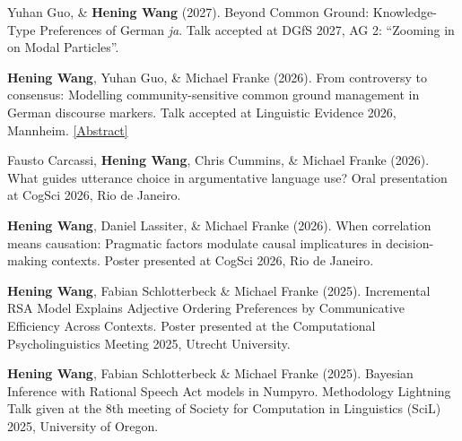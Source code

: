 \documentclass[letterpaper,11pt]{article}
\begin{document}
\begin{description}
\item {Yuhan Guo, \& \textbf{Hening Wang} (2027). Beyond Common Ground: Knowledge-Type Preferences of German \textit{ja}. Talk accepted at DGfS 2027, AG 2: ``Zooming in on Modal Particles''.}

\item {\textbf{Hening Wang}, Yuhan Guo, \& Michael Franke (2026). From controversy to consensus: Modelling community-sensitive common ground management in German discourse markers. Talk accepted at Linguistic Evidence 2026, Mannheim. \href{https://heningwang.github.io/my_homepage/files/LE2026-abstract.pdf}{[Abstract]}}

\item {Fausto Carcassi, \textbf{Hening Wang}, Chris Cummins, \& Michael Franke (2026). What guides utterance choice in argumentative language use? Oral presentation at CogSci 2026, Rio de Janeiro.}

\item {\textbf{Hening Wang}, Daniel Lassiter, \& Michael Franke (2026). When correlation means causation: Pragmatic factors modulate causal implicatures in decision-making contexts. Poster presented at CogSci 2026, Rio de Janeiro.}

\item {\textbf{Hening Wang}, Fabian Schlotterbeck \& Michael Franke (2025). Incremental RSA Model Explains Adjective Ordering Preferences by Communicative Efficiency Across Contexts. Poster presented at the Computational Psycholinguistics Meeting 2025, Utrecht University.}

\item {\textbf{Hening Wang}, Fabian Schlotterbeck \& Michael Franke (2025). Bayesian Inference with Rational Speech Act models in Numpyro. Methodology Lightning Talk given at the 8th meeting of Society for Computation in Linguistics (SciL) 2025, University of Oregon.}


\end{description}
\end{document}
